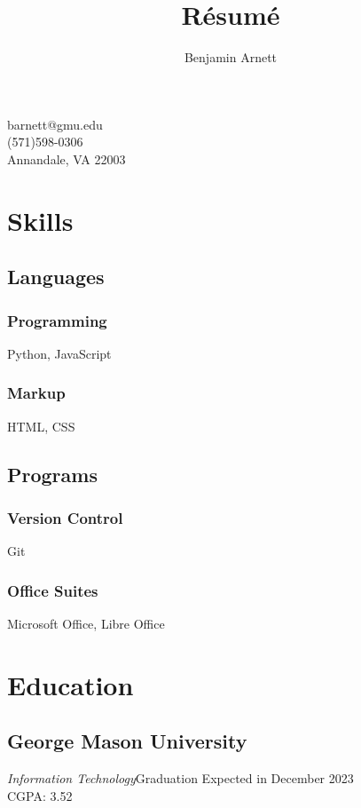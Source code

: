 \documentclass{article}
\makeatletter
\renewcommand{\maketitle}{
\begin{center}
{\huge\bfseries\theauthor}

\vspace{.25em}

barnett@gmu.edu \\
(571)598-0306 \\ 
Annandale, VA 22003

\end{center}
}
\makeatother
\begin{document}
\title{R\'esum\'e}
\author{Benjamin Arnett}

\maketitle

\section{Skills}

\subsection{Languages}

\subsubsection{Programming}

Python, JavaScript

\subsubsection{Markup}

HTML, CSS

\subsection{Programs}

\subsubsection{Version Control}

Git

\subsubsection{Office Suites}

Microsoft Office, Libre Office

\section{Education}

\subsection{George Mason University}
\emph{Information Technology}\hfill Graduation Expected in December 2023\\CGPA: 3.52
\end{document}
